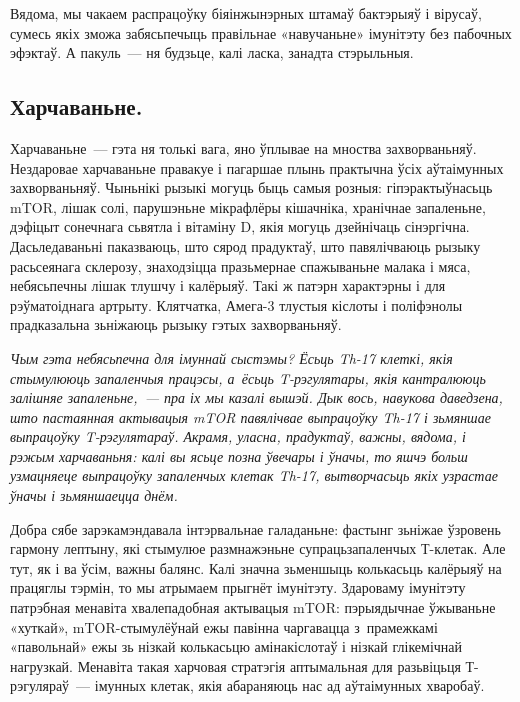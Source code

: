 Вядома, мы чакаем распрацоўку біяінжынэрных штамаў бактэрыяў і вірусаў, сумесь якіх зможа забясьпечыць правільнае «навучаньне» імунітэту без пабочных эфэктаў. А пакуль~--- ня будзьце, калі ласка, занадта стэрыльныя.

\subsection*{Харчаваньне.}

Харчаваньне~--- гэта ня толькі вага, яно ўплывае на мноства захворваньняў. Нездаровае харчаваньне правакуе і пагаршае плынь практычна ўсіх аўтаімунных захворваньняў. Чыньнікі рызыкі могуць быць самыя розныя: гіпэрактыўнасьць mTOR, лішак солі, парушэньне мікрафлёры кішачніка, хранічнае запаленьне, дэфіцыт сонечнага сьвятла і вітаміну D, якія могуць дзейнічаць сінэргічна. Дасьледаваньні паказваюць, што сярод прадуктаў, што павялічваюць рызыку расьсеянага склерозу, знаходзіцца празьмернае спажываньне малака і мяса, небясьпечны лішак тлушчу і калёрыяў. Такі ж патэрн характэрны і для рэўматоіднага артрыту. Клятчатка, Амега-3 тлустыя кіслоты і поліфэнолы прадказальна зьніжаюць рызыку гэтых захворваньняў. 


\emph{Чым гэта небясьпечна для імуннай сыстэмы? Ёсьць Th-17 клеткі, якія стымулююць запаленчыя працэсы, а~ёсьць T-рэгулятары, якія кантралююць залішняе запаленьне,~--- пра іх мы казалі вышэй. Дык вось, навукова даведзена, што пастаянная актывацыя mTOR павялічвае выпрацоўку Th-17 і зьмяншае выпрацоўку T-рэгулятараў. Акрамя, уласна, прадуктаў, важны, вядома, і рэжым харчаваньня: калі вы ясьце позна ўвечары і ўначы, то яшчэ больш узмацняеце выпрацоўку запаленчых клетак Th-17, вытворчасьць якіх узрастае ўначы і зьмяншаецца днём.}

Добра сябе зарэкамэндавала інтэрвальнае галаданьне: фастынг зьніжае ўзровень гармону лептыну, які стымулюе размнажэньне супрацьзапаленчых Т-клетак. Але тут, як і ва ўсім, важны балянс. Калі значна зьменшыць колькасьць калёрыяў на працяглы тэрмін, то мы атрымаем прыгнёт імунітэту. Здароваму імунітэту патрэбная менавіта хвалепадобная актывацыя mTOR: пэрыядычнае ўжываньне «хуткай», mTOR-стымулёўнай ежы павінна чаргавацца з~прамежкамі «павольнай» ежы зь нізкай колькасьцю амінакіслотаў і нізкай глікемічнай нагрузкай. Менавіта такая харчовая стратэгія аптымальная для разьвіцьця Т-рэгуляраў~--- імунных клетак, якія абараняюць нас ад аўтаімунных хваробаў.

